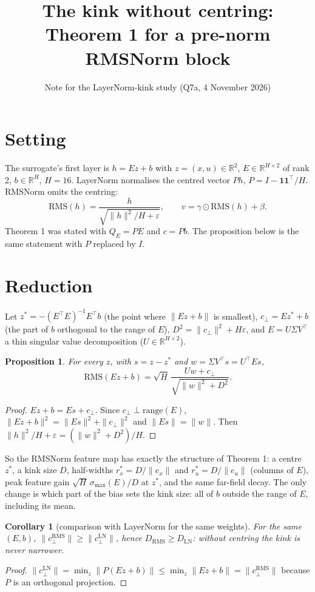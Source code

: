 \documentclass[11pt]{article}
\title{The kink without centring: Theorem 1 for a pre-norm RMSNorm block}
\author{Note for the LayerNorm-kink study (Q7a, 4 November 2026)}
\date{}
\newtheorem{proposition}{Proposition}
\newtheorem{corollary}{Corollary}
\begin{document}
\maketitle

\section{Setting}
The surrogate's first layer is $h = E z + b$ with $z = (x, u) \in \mathbb{R}^2$, $E \in \mathbb{R}^{H \times 2}$ of rank 2,
$b \in \mathbb{R}^H$, $H = 16$. LayerNorm normalises the centred vector $P h$, $P = I - \mathbf{1}\mathbf{1}^\top / H$.
RMSNorm omits the centring:
\[
  \mathrm{RMS}(h) = \frac{h}{\sqrt{\|h\|^2 / H + \varepsilon}}, \qquad
  v = \gamma \odot \mathrm{RMS}(h) + \beta .
\]
Theorem 1 was stated with $Q_E = P E$ and $c = P b$. The proposition below is the same statement with $P$ replaced by $I$.

\section{Reduction}
Let $z^\ast = -(E^\top E)^{-1} E^\top b$ (the point where $\|E z + b\|$ is smallest), $c_\perp = E z^\ast + b$ (the
part of $b$ orthogonal to the range of $E$), $D^2 = \|c_\perp\|^2 + H \varepsilon$, and $E = U \Sigma V^\top$ a thin singular
value decomposition ($U \in \mathbb{R}^{H \times 2}$).

\begin{proposition}
For every $z$, with $s = z - z^\ast$ and $w = \Sigma V^\top s = U^\top E s$,
\[
  \mathrm{RMS}(E z + b) = \sqrt{H}\, \frac{U w + c_\perp}{\sqrt{\|w\|^2 + D^2}} .
\]
\end{proposition}
\begin{proof}
$E z + b = E s + c_\perp$. Since $c_\perp \perp \mathrm{range}(E)$, $\|E z + b\|^2 = \|E s\|^2 + \|c_\perp\|^2$ and
$\|E s\| = \|w\|$. Then $\|h\|^2/H + \varepsilon = (\|w\|^2 + D^2)/H$.
\end{proof}

So the RMSNorm feature map has exactly the structure of Theorem 1: a centre $z^\ast$, a kink size $D$, half-widths
$r^\ast_x = D / \|e_x\|$ and $r^\ast_u = D / \|e_u\|$ (columns of $E$), peak feature gain $\sqrt{H}\,\sigma_{\max}(E) / D$ at
$z^\ast$, and the same far-field decay. The only change is which part of the bias sets the kink size: all of $b$ outside the
range of $E$, including its mean.

\begin{corollary}[comparison with LayerNorm for the same weights]
For the same $(E, b)$, $\|c_\perp^{\mathrm{RMS}}\| \ge \|c_\perp^{\mathrm{LN}}\|$, hence
$D_{\mathrm{RMS}} \ge D_{\mathrm{LN}}$: without centring the kink is never narrower.
\end{corollary}
\begin{proof}
$\|c_\perp^{\mathrm{LN}}\| = \min_z \|P (E z + b)\| \le \min_z \|E z + b\| = \|c_\perp^{\mathrm{RMS}}\|$ because $P$ is an
orthogonal projection.
\end{proof}
\end{document}
